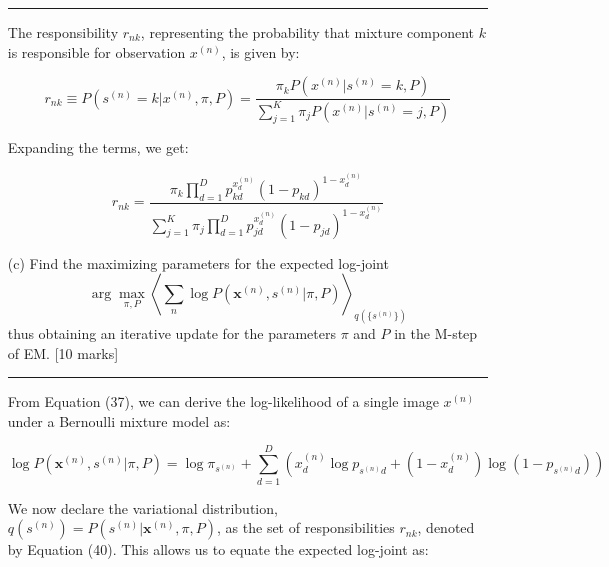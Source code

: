 \documentclass{article}
\begin{document}
\begin{enumerate}
    \noindent\textcolor{gray}{\rule{0.1\linewidth}{0.4pt}}
    \vspace{10pt}

    The responsibility \( r_{nk} \), representing the probability that mixture component \( k \) is responsible for observation \( x^{(n)} \), is given by:
    
    \begin{equation}
    r_{nk} \equiv P(s^{(n)} = k | x^{(n)}, \pi, P) = \frac{\pi_k P(x^{(n)} | s^{(n)} = k, P)}{\sum_{j=1}^K \pi_j P(x^{(n)} | s^{(n)} = j, P)}
    \end{equation}
    
    Expanding the terms, we get:
    
    \begin{equation}
    \boxed{r_{nk} = \frac{\pi_k \prod_{d=1}^D p_{kd}^{x^{(n)}_d} (1 - p_{kd})^{1 - x^{(n)}_d}}{\sum_{j=1}^K \pi_j \prod_{d=1}^D p_{jd}^{x^{(n)}_d} (1 - p_{jd})^{1 - x^{(n)}_d}}}
    \end{equation}
    

    \vspace{10pt}
    
    \item[(c)] Find the maximizing parameters for the expected log-joint
    \begin{equation}
    \arg\max_{\pi, P} \left\langle \sum_n \log P(\mathbf{x}^{(n)}, s^{(n)} | \pi, P) \right\rangle_{q(\{s^{(n)}\})}
    \end{equation}
    thus obtaining an iterative update for the parameters \(\pi\) and \(P\) in the M-step of EM. [10 marks]

    \noindent\textcolor{gray}{\rule{0.1\linewidth}{0.4pt}}
    \vspace{10pt}

    From Equation (37), we can derive the log-likelihood of a single image \( x^{(n)} \) under a Bernoulli mixture model as:
    
    \begin{equation}
    \log P(\mathbf{x}^{(n)}, s^{(n)} | \pi, P) = \log \pi_{s^{(n)}} + \sum_{d=1}^D \left( x_d^{(n)} \log p_{s^{(n)}d} + (1 - x_d^{(n)}) \log (1 - p_{s^{(n)}d}) \right)
    \end{equation}
    
    We now declare the variational distribution, \( q(s^{(n)}) = P(s^{(n)} | \mathbf{x}^{(n)}, \pi, P) \), as the set of responsibilities \( r_{nk} \), denoted by Equation (40). This allows us to equate the expected log-joint as: 
    

\end{enumerate}
\end{document}
